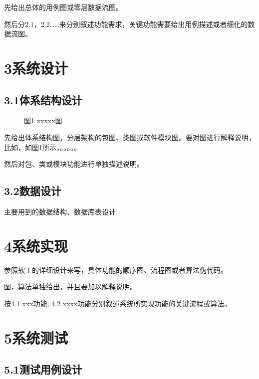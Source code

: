 \documentclass[12pt,a4paper,oneside]{ctexart}
\begin{document}
\par 先给出总体的用例图或零层数据流图。
\par 然后分2.1，2.2……来分别叙述功能需求，关键功能需要给出用例描述或者细化的数据流图。
\section{3系统设计}

\subsection{3.1体系结构设计}

\begin{figure}[htbp]
\centering
\caption{图1  xxxxx图}
\end{figure}

\par 先给出体系结构图，分层架构的包图、类图或软件模块图。要对图进行解释说明，比如，如图1所示，。。。。。
\par 然后对包、类或模块功能进行单独描述说明。
\subsection{3.2数据设计}

\par 主要用到的数据结构、数据库表设计
\section{4系统实现}

\par 参照软工的详细设计来写，具体功能的顺序图、流程图或者算法伪代码。
\par 图，算法单独给出，并且要加以解释说明。
\par 按4.1 xxx功能, 4.2 xxxx功能分别叙述系统所实现功能的关键流程或算法。
\section{5系统测试}

\subsection{5.1测试用例设计}
\end{document}
